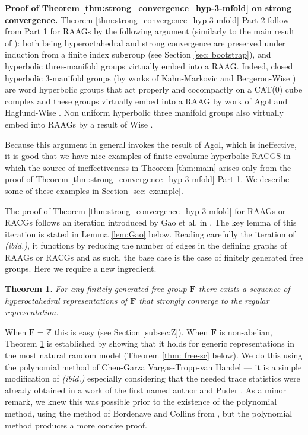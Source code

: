 \documentclass[12pt]{article}
\newtheorem{theorem}{Theorem}[section]
\newcommand{\Z}{\mathbb{Z}}
\newcommand{\1}{\mathds{1}}
\begin{document}
{\bf Proof of Theorem \ref{thm:strong_convergence_hyp-3-mfold}  on strong convergence.}
Theorem \ref{thm:strong_convergence_hyp-3-mfold} Part 2 follow from Part 1 for RAAGs by the following argument (similarly to the main result of \cite{MageeThomas}): both being hyperoctahedral and strong convergence  are preserved under induction from a finite index subgroup (see Section \ref{sec: bootstrap}), and hyperbolic three-manifold groups virtually embed into a RAAG. Indeed, closed hyperbolic 3-manifold groups (by works of Kahn-Markovic \cite{KM} and Bergeron-Wise \cite[Theorem 5.3]{BW}) are word hyperbolic groups that act properly and cocompactly on a CAT(0) cube complex and these groups virtually embed into a RAAG by work of Agol \cite{Agol} and Haglund-Wise \cite{HW}. 
Non uniform hyperbolic three manifold groups also virtually embed into RAAGs by a result of Wise \cite[Thm. 14.29]{WiseBook}. 

Because this argument in general invokes the result of Agol, which is ineffective, it is good that we have nice examples of finite covolume hyperbolic RACGS in which the source of ineffectiveness in Theorem \ref{thm:main} arises only from the proof of Theorem \ref{thm:strong_convergence_hyp-3-mfold} Part 1. We describe some of these examples in Section \ref{sec: example}.

The proof of Theorem \ref{thm:strong_convergence_hyp-3-mfold} for RAAGs or RACGs follows an iteration introduced by Gao et al. in \cite{gao2026newsourcepurelyfinite}. The key lemma of this iteration is stated in Lemma \ref{lem:Gao} below.  Reading carefully the iteration of \emph{(ibid.)}, it functions by reducing the number of edges in the defining graphs of RAAGs or RACGs and as such, the base case is the case of finitely generated free groups. Here we require a new ingredient.
\begin{theorem}
\label{thm:hyp-oct-reps-thm}
For any finitely generated free group $\mathbf{F}$ there exists a sequence of hyperoctahedral representations of $\mathbf{F}$ that strongly converge to the regular representation.
\end{theorem}
When $\mathbf{F}=\Z$ this is easy (see Section \ref{subsec:Z}). When $\mathbf{F}$ is non-abelian, Theorem \ref{thm:hyp-oct-reps-thm} is established by showing that it holds for generic representations in the most natural random model (Theorem \ref{thm: free-sc} below). 
We do this using the polynomial method of Chen-Garza Vargas-Tropp-van Handel \cite{chennew} --- it is a simple modification of \emph{(ibid.)} especially considering that the needed trace statistics were already obtained in a work of the first named author and Puder \cite{Ma.Pu2021}.
As a minor remark, we knew this was possible prior to the existence of the polynomial method, using the method of Bordenave and Collins from \cite{BordenaveCollins}, but the polynomial method produces a more concise proof.
\end{document}
